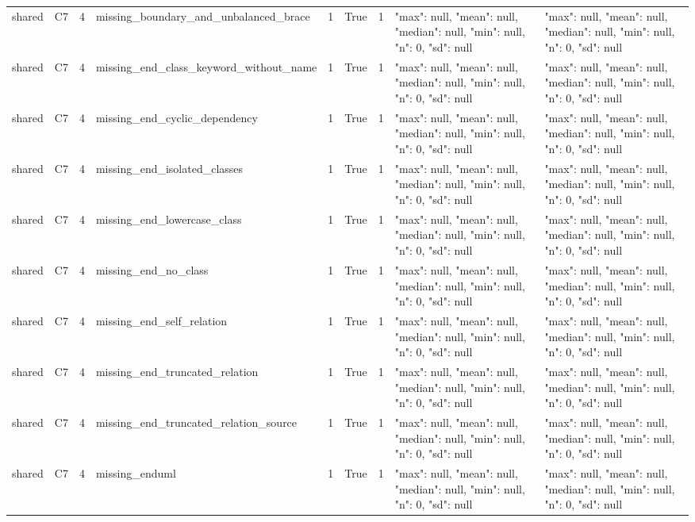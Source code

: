 \begin{tabular}{lllllllll}
shared & C7 & 4 & missing\_boundary\_and\_unbalanced\_brace & 1 & True & 1 & {"max": null, "mean": null, "median": null, "min": null, "n": 0, "sd": null} & {"max": null, "mean": null, "median": null, "min": null, "n": 0, "sd": null} \\
shared & C7 & 4 & missing\_end\_class\_keyword\_without\_name & 1 & True & 1 & {"max": null, "mean": null, "median": null, "min": null, "n": 0, "sd": null} & {"max": null, "mean": null, "median": null, "min": null, "n": 0, "sd": null} \\
shared & C7 & 4 & missing\_end\_cyclic\_dependency & 1 & True & 1 & {"max": null, "mean": null, "median": null, "min": null, "n": 0, "sd": null} & {"max": null, "mean": null, "median": null, "min": null, "n": 0, "sd": null} \\
shared & C7 & 4 & missing\_end\_isolated\_classes & 1 & True & 1 & {"max": null, "mean": null, "median": null, "min": null, "n": 0, "sd": null} & {"max": null, "mean": null, "median": null, "min": null, "n": 0, "sd": null} \\
shared & C7 & 4 & missing\_end\_lowercase\_class & 1 & True & 1 & {"max": null, "mean": null, "median": null, "min": null, "n": 0, "sd": null} & {"max": null, "mean": null, "median": null, "min": null, "n": 0, "sd": null} \\
shared & C7 & 4 & missing\_end\_no\_class & 1 & True & 1 & {"max": null, "mean": null, "median": null, "min": null, "n": 0, "sd": null} & {"max": null, "mean": null, "median": null, "min": null, "n": 0, "sd": null} \\
shared & C7 & 4 & missing\_end\_self\_relation & 1 & True & 1 & {"max": null, "mean": null, "median": null, "min": null, "n": 0, "sd": null} & {"max": null, "mean": null, "median": null, "min": null, "n": 0, "sd": null} \\
shared & C7 & 4 & missing\_end\_truncated\_relation & 1 & True & 1 & {"max": null, "mean": null, "median": null, "min": null, "n": 0, "sd": null} & {"max": null, "mean": null, "median": null, "min": null, "n": 0, "sd": null} \\
shared & C7 & 4 & missing\_end\_truncated\_relation\_source & 1 & True & 1 & {"max": null, "mean": null, "median": null, "min": null, "n": 0, "sd": null} & {"max": null, "mean": null, "median": null, "min": null, "n": 0, "sd": null} \\
shared & C7 & 4 & missing\_enduml & 1 & True & 1 & {"max": null, "mean": null, "median": null, "min": null, "n": 0, "sd": null} & {"max": null, "mean": null, "median": null, "min": null, "n": 0, "sd": null} \\

\end{tabular}
